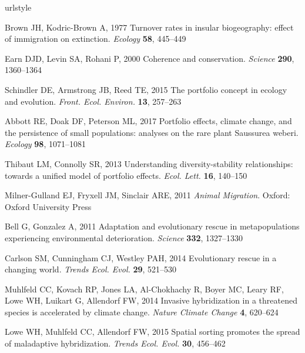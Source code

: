 \documentclass{revtex4}
\begin{document}
% 
\begin{thebibliography}{10}
\expandafter\ifx\csname urlstyle\endcsname\relax
  \providecommand{\doi}[1]{doi:\discretionary{}{}{}#1}\else
  \providecommand{\doi}{doi:\discretionary{}{}{}\begingroup
  \urlstyle{rm}\Url}\fi

Brown JH, Kodric-Brown A, 1977 {Turnover rates in insular biogeography: effect
  of immigration on extinction}.
\newblock \emph{Ecology} \textbf{58}, 445--449

Earn DJD, Levin SA, Rohani P, 2000 {Coherence and conservation}.
\newblock \emph{Science} \textbf{290}, 1360--1364

Schindler DE, Armstrong JB, Reed TE, 2015 {The portfolio concept in ecology and
  evolution}.
\newblock \emph{Front. Ecol. Environ.} \textbf{13}, 257--263

Abbott RE, Doak DF, Peterson ML, 2017 {Portfolio effects, climate change, and
  the persistence of small populations: analyses on the rare plant Saussurea
  weberi.}
\newblock \emph{Ecology} \textbf{98}, 1071--1081

Thibaut LM, Connolly SR, 2013 {Understanding diversity-stability relationships:
  towards a unified model of portfolio effects.}
\newblock \emph{Ecol. Lett.} \textbf{16}, 140--150

Milner-Gulland EJ, Fryxell JM, Sinclair ARE, 2011 \emph{{Animal Migration}}.
\newblock Oxford: Oxford University Press

Bell G, Gonzalez A, 2011 {Adaptation and evolutionary rescue in metapopulations
  experiencing environmental deterioration}.
\newblock \emph{Science} \textbf{332}, 1327--1330

Carlson SM, Cunningham CJ, Westley PAH, 2014 {Evolutionary rescue in a changing
  world}.
\newblock \emph{Trends Ecol. Evol.} \textbf{29}, 521--530

Muhlfeld CC, Kovach RP, Jones LA, Al-Chokhachy R, Boyer MC, Leary RF, Lowe WH,
  Luikart G, Allendorf FW, 2014 {Invasive hybridization in a threatened species
  is accelerated by climate change}.
\newblock \emph{Nature Climate Change} \textbf{4}, 620--624

Lowe WH, Muhlfeld CC, Allendorf FW, 2015 {Spatial sorting promotes the spread
  of maladaptive hybridization}.
\newblock \emph{Trends Ecol. Evol.} \textbf{30}, 456--462


\end{thebibliography}
\end{document}
